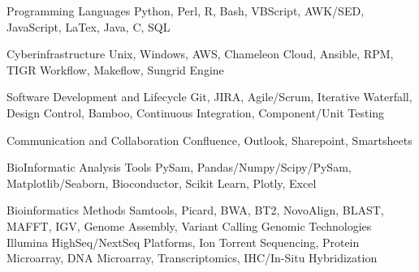 

\begin{cvskills}

  \cvskill
    {Programming Languages} %
    {Python, Perl, R, Bash, VBScript, AWK/SED, JavaScript, LaTex, Java, C, SQL} %

  \cvskill
    {Cyberinfrastructure} %
    {Unix, Windows, AWS, Chameleon Cloud, Ansible, RPM, TIGR Workflow, Makeflow, Sungrid Engine} %

  \cvskill
    {Software Development and Lifecycle} %
    {Git, JIRA, Agile/Scrum, Iterative Waterfall, Design Control, Bamboo, Continuous Integration, Component/Unit Testing} %

    \cvskill
    {Communication and Collaboration}
    {Confluence, Outlook, Sharepoint, Smartsheets}

  \cvskill
    {BioInformatic Analysis Tools} %
    {PySam, Pandas/Numpy/Scipy/PySam, Matplotlib/Seaborn, Bioconductor, Scikit Learn, Plotly, Excel} %

  \cvskill
    {Bioinformatics Methods} %
    {Samtools, Picard, BWA, BT2, NovoAlign, BLAST, MAFFT, IGV, Genome Assembly, Variant Calling} %
  \cvskill
    {Genomic Technologies} %
    {Illumina HighSeq/NextSeq Platforms, Ion Torrent Sequencing, Protein Microarray, DNA Microarray, Transcriptomics, IHC/In-Situ Hybridization} %






\end{cvskills}
